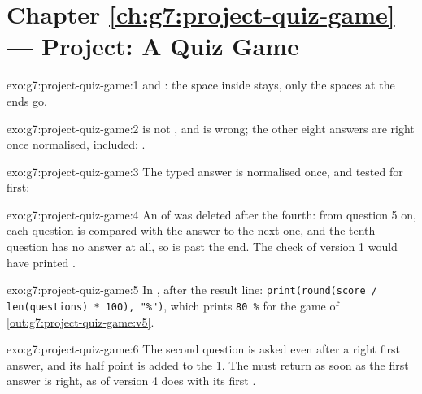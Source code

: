 \section*{Chapter \ref{ch:g7:project-quiz-game} --- Project: A Quiz Game}

\begin{solution}{exo:g7:project-quiz-game:1}
 and : the space inside stays, only the spaces
at the ends go.
\end{solution}

\begin{solution}{exo:g7:project-quiz-game:2}
 is not , and  is wrong; the other eight answers
are right once normalised,  included: .
\end{solution}

\begin{solution}{exo:g7:project-quiz-game:3}
The typed answer is normalised once, and tested for  first:

\label{lst:g7:project-quiz-game:sol-skip}
\end{solution}

\begin{solution}{exo:g7:project-quiz-game:4}
An  of  was deleted after the fourth: from question 5 on,
each question is compared with the answer to the next one, and the tenth
question has no answer at all, so  is past the end. The
check  of version 1 would have
printed .
\end{solution}

\begin{solution}{exo:g7:project-quiz-game:5}
In , after the result line:
\texttt{print(round(score / len(questions) * 100), "\%")}, which prints
\texttt{80 \%} for the game of \cref{out:g7:project-quiz-game:v5}.
\end{solution}

\begin{solution}{exo:g7:project-quiz-game:6}
The second question is asked even after a right first answer, and its half
point is added to the 1. The  must return as soon as the first
answer is right, as  of version 4 does with its first
.
\end{solution}

